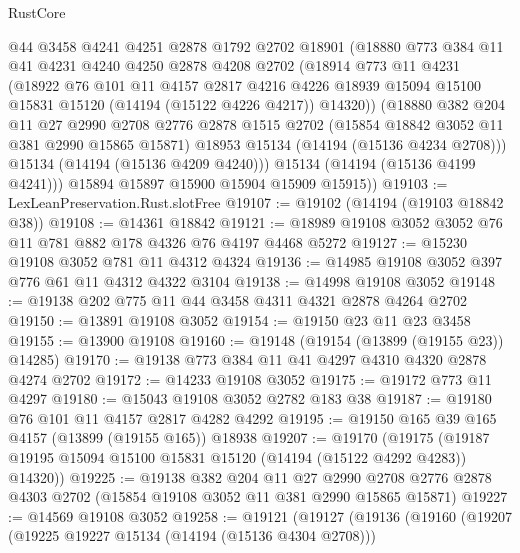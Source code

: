 \begin{lexlean}{RustCore}
\begin{coremodule}
          @44
          @3458
          @4241
          @4251
          @2878
          @1792
          @2702
          @18901
          (@18880
            @773
            @384
            @11
            @41
            @4231
            @4240
            @4250
            @2878
            @4208
            @2702
            (@18914
              @773
              @11
              @4231
              (@18922
                @76
                @101
                @11
                @4157
                @2817
                @4216
                @4226
                @18939
                @15094
                @15100
                @15831
                @15120
                (@14194 (@15122 @4226 @4217))
                @14320))
            (@18880
              @382
              @204
              @11
              @27
              @2990
              @2708
              @2776
              @2878
              @1515
              @2702
              (@15854 @18842 @3052 @11 @381 @2990 @15865 @15871)
              @18953
              @15134
              (@14194 (@15136 @4234 @2708)))
            @15134
            (@14194 (@15136 @4209 @4240)))
          @15134
          (@14194 (@15136 @4199 @4241)))
        @15894
        @15897
        @15900
        @15904
        @15909
        @15915))
@19103 := LexLeanPreservation.Rust.slotFree
@19107 := @19102 (@14194 (@19103 @18842 @38))
@19108 := @14361 @18842
@19121 := @18989 @19108 @3052 @3052 @76 @11 @781 @882 @178 @4326 @76 @4197 @4468 @5272
@19127 := @15230 @19108 @3052 @781 @11 @4312 @4324
@19136 := @14985 @19108 @3052 @397 @776 @61 @11 @4312 @4322 @3104
@19138 := @14998 @19108 @3052
@19148 := @19138 @202 @775 @11 @44 @3458 @4311 @4321 @2878 @4264 @2702
@19150 := @13891 @19108 @3052
@19154 := @19150 @23 @11 @23 @3458
@19155 := @13900 @19108
@19160 := @19148 (@19154 (@13899 (@19155 @23)) @14285)
@19170 := @19138 @773 @384 @11 @41 @4297 @4310 @4320 @2878 @4274 @2702
@19172 := @14233 @19108 @3052
@19175 := @19172 @773 @11 @4297
@19180 := @15043 @19108 @3052 @2782 @183 @38
@19187 := @19180 @76 @101 @11 @4157 @2817 @4282 @4292
@19195 := @19150 @165 @39 @165 @4157 (@13899 (@19155 @165)) @18938
@19207 := @19170
    (@19175 (@19187 @19195 @15094 @15100 @15831 @15120 (@14194 (@15122 @4292 @4283)) @14320))
@19225 := @19138
    @382
    @204
    @11
    @27
    @2990
    @2708
    @2776
    @2878
    @4303
    @2702
    (@15854 @19108 @3052 @11 @381 @2990 @15865 @15871)
@19227 := @14569 @19108 @3052
@19258 := @19121
    (@19127
      (@19136
        (@19160
          (@19207
            (@19225 @19227 @15134 (@14194 (@15136 @4304 @2708)))

\end{coremodule}
\end{lexlean}
